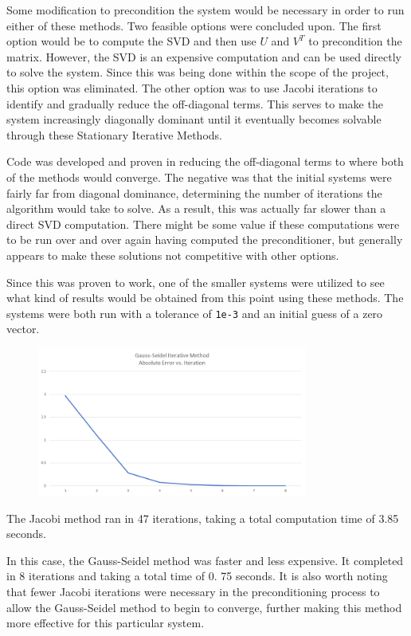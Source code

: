 \documentclass[10pt]{article}
\begin{document}
\begin{multicols}{2}
Some modification to precondition the system would be necessary in order to run either of these methods.
Two feasible options were concluded upon.
The first option would be to compute the SVD and then use $U$ and $V^T$ to precondition the matrix.
However, the SVD is an expensive computation and can be used directly to solve the system.
Since this was being done within the scope of the project, this option was eliminated.
The other option was to use Jacobi iterations to identify and gradually reduce the off-diagonal terms.
This serves to make the system increasingly diagonally dominant until it eventually becomes solvable through these Stationary Iterative Methods.

Code was developed and proven in reducing the off-diagonal terms to where both of the methods would converge.
The negative was that the initial systems were fairly far from diagonal dominance, determining the number of iterations the algorithm would take to solve.
As a result, this was actually far slower than a direct SVD computation.
There might be some value if these computations were to be run over and over again having computed the preconditioner, but generally appears to make these solutions not competitive with other options.

Since this was proven to work, one of the smaller systems were utilized to see what kind of results would be obtained from this point using these methods.
The systems were both run with a tolerance of \texttt{1e-3} and an initial guess of a zero vector.

\begin{figure}[H]
	\centering
	\includegraphics[width=3.5in]{../img/fred_stat_it/img1.png}
\end{figure}
The Jacobi method ran in 47 iterations, taking a total computation time of 3.85 seconds.

In this case, the Gauss-Seidel method was faster and less expensive.
It completed in 8 iterations and taking a total time of 0.
75 seconds.
It is also worth noting that fewer Jacobi iterations were necessary in the preconditioning process to allow the Gauss-Seidel method to begin to converge, further making this method more effective for this particular system.


\end{multicols}
\end{document}
